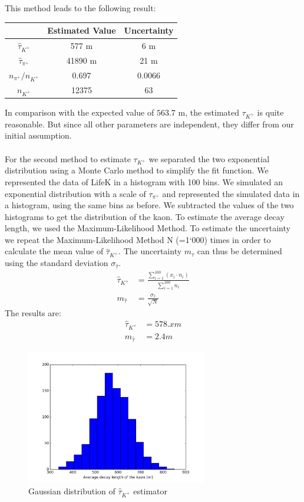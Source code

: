 \documentclass[a4paper,parskip,11pt, DIV12]{scrreprt}
\begin{document}
This method leads to the following result:\\
\begin{tabular}{c|cc}
\centering
 & Estimated Value  & Uncertainty \\ 
\hline 
$\hat{\tau}_{K^+}$ & 577 m & 6 m \\ 

$\hat{\tau}_{\pi^+}$ & 41890 m  & 21 m  \\

${n_{\pi^+}}/{n_{K^+}}$ & 0.697 & 0.0066 \\ 

$n_{K^+}$ & 12375 & 63 \\
\end{tabular} 

In comparison with the expected value of $563.7$ m, the estimated $\tau_{K^+}$ is quite reasonable. But since all other parameters are independent, they differ from our initial assumption.
\\
\\
For the second method to estimate $\tau_{K^+}$ we separated the two exponential distribution using a Monte Carlo method to simplify the fit function. We represented the data of LifeK in a histogram with 100 bins. We simulated an exponential distribution with a scale of $\tau_{\pi^+}$ and represented the simulated data in a histogram, using the same bins as before. We subtracted the values of the two histograms to get the distribution of the kaon. To estimate the average decay length, we used the Maximum-Likelihood Method. To estimate the uncertainty we repeat the Maximum-Likelihood Method N (=1`000) times in order to calculate the mean value of $\hat{\tau}_{K^+}$. The uncertainty $m_{\tau}$ can thus be determined using the standard deviation $\sigma_{\hat{\tau}}$.
\begin{align*}
\hat{\tau}_{K^+}&= \frac{\sum_{i=1}^{100} (x_i \cdot n_i)}{\sum_{i=1}^{100} n_i}\\
m_{\hat{\tau}}&= \frac{\sigma_{\hat{\tau}}}{\sqrt{N}}
\end{align*}
The results are:
\begin{align*}
\hat{\tau}_{K^+}&=578.x m \\
m_{\hat{\tau}}&=2.4 m
\end{align*}

\begin{figure}[htbp] 
\centering
\includegraphics[width=0.7\textwidth]{hist_tau_estimator3.jpg}
\caption{Gaussian distribution of $\hat{\tau}_{K^+}$ estimator}
\label{fig:Bild1}
\end{figure}
\end{document}
